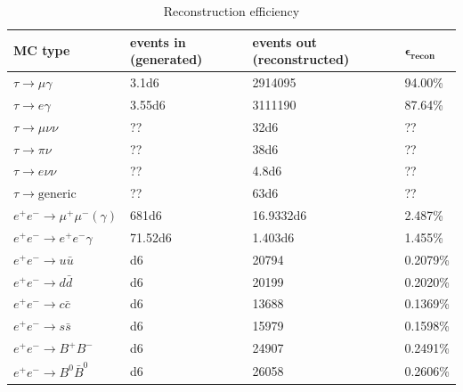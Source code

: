 \documentclass[12pt,a4paper]{article} %
\begin{document}
\begin{table}[h]
\centering
\begin{tabular}{llll}
\textbf{MC type}         & \textbf{events in (generated)} & \textbf{events out (reconstructed)} & $\mathbf{\epsilon_{\text{recon}}}$ \\ \hline 
\rowcolor[HTML]{EFEFEF} 
$\tau\to\mu\gamma$       & \num{3.1d6}        & 2914095             & 94.00\%                            \\
\rowcolor[HTML]{EFEFEF} 
$\tau\to e \gamma$      & \num{3.55d6}       & 3111190             & 87.64\%                            \\
$\tau\to\mu\nu\nu$      & ??                 & \num{32d6}          & ??                                 \\
$\tau\to\pi\nu$         & ??                 & \num{38d6}          & ??                                 \\
$\tau\to e\nu\nu$       & ??                 & \num{4.8d6}         & ??                                 \\
$\tau\to\text{generic}$  & ??                 & \num{63d6}          & ??                                 \\
$e^+ e^- \to \mu^+ \mu^- (\gamma)$       & \num{681d6}        & \num{16.9332d6}     & 2.487\%             \\
$e^+ e^- \to e^+ e^- \gamma$      & \num{71.52d6}      & \num{1.403d6}       & 1.455\%                            \\
$e^+ e^- \to u \bar{u}$       & \num{d6}           & 20794               & 0.2079\%                           \\
$e^+ e^- \to d \bar{d}$        & \num{d6}           & 20199               & 0.2020\%                           \\
$e^+ e^- \to c \bar{c}$        & \num{d6}           & 13688               & 0.1369\%                           \\
$e^+ e^- \to s \bar{s}$       & \num{d6}           & 15979               & 0.1598\%                           \\
$e^+ e^- \to B^+ B^-$     & \num{d6}           & 24907               & 0.2491\%                           \\
$e^+ e^- \to B^0 \bar{B}^0$       & \num{d6}           & 26058               & 0.2606\%                          
\end{tabular}
\caption{Reconstruction efficiency}
\label{my-label}
\end{table}
\end{document}
